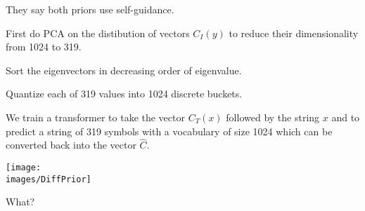 {\vfill
They say both priors use self-guidance.


First do PCA on the distibution of vectors $C_I(y)$ to reduce their dimensionality from 1024 to 319.

\vfill
Sort the eigenvectors in decreasing order of eigenvalue.

\vfill
Quantize each of 319 values into 1024 discrete buckets.

\vfill
We train a transformer to take the vector $C_T(x)$ followed by the string $x$
and to predict a string of 319 symbols with a vocabulary of size 1024 which can be converted back into the vector $\hat{C}$.


\centerline{\texttt{[image: \\images/DiffPrior]}}

\vfill
\vfill
What?

}


